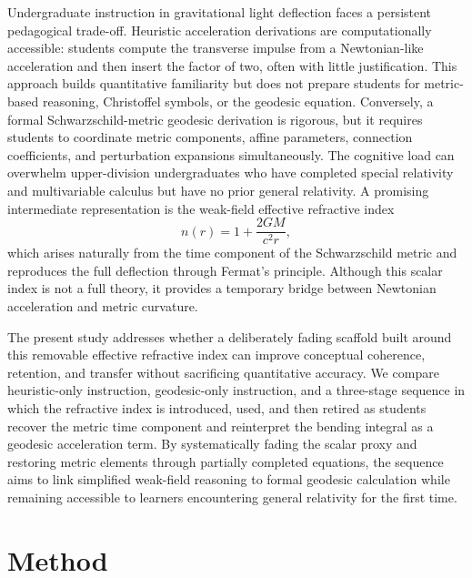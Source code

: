 \documentclass{article}
\begin{document}
Undergraduate instruction in gravitational light deflection faces a persistent pedagogical trade-off. Heuristic acceleration derivations are computationally accessible: students compute the transverse impulse from a Newtonian-like acceleration and then insert the factor of two, often with little justification. This approach builds quantitative familiarity but does not prepare students for metric-based reasoning, Christoffel symbols, or the geodesic equation. Conversely, a formal Schwarzschild-metric geodesic derivation is rigorous, but it requires students to coordinate metric components, affine parameters, connection coefficients, and perturbation expansions simultaneously. The cognitive load can overwhelm upper-division undergraduates who have completed special relativity and multivariable calculus but have no prior general relativity. A promising intermediate representation is the weak-field effective refractive index
\begin{equation}
n(r) = 1 + \frac{2GM}{c^2 r},
\end{equation}
which arises naturally from the time component of the Schwarzschild metric and reproduces the full deflection through Fermat’s principle. Although this scalar index is not a full theory, it provides a temporary bridge between Newtonian acceleration and metric curvature.

The present study addresses whether a deliberately fading scaffold built around this removable effective refractive index can improve conceptual coherence, retention, and transfer without sacrificing quantitative accuracy. We compare heuristic-only instruction, geodesic-only instruction, and a three-stage sequence in which the refractive index is introduced, used, and then retired as students recover the metric time component and reinterpret the bending integral as a geodesic acceleration term. By systematically fading the scalar proxy and restoring metric elements through partially completed equations, the sequence aims to link simplified weak-field reasoning to formal geodesic calculation while remaining accessible to learners encountering general relativity for the first time.

\section{Method}
\end{document}
